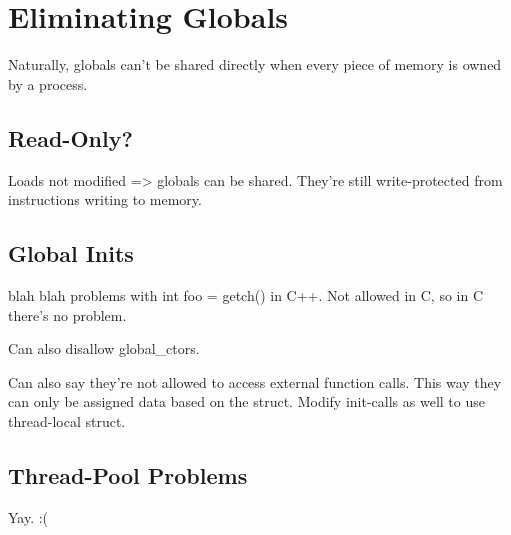 \chapter {Eliminating Globals}

Naturally, globals can't be shared directly when every piece of memory is owned
by a process.


\section {Read-Only?}

Loads not modified => globals can be shared. They're still write-protected from
instructions writing to memory.


\section {Global Inits}

blah blah problems with int foo = getch() in C++. Not allowed in C, so in C
there's no problem.

Can also disallow global\_ctors.

Can also say they're not allowed to access external function calls. This way
they can only be assigned data based on the struct. Modify init-calls as well
to use thread-local struct.


\section {Thread-Pool Problems}

Yay. :(

